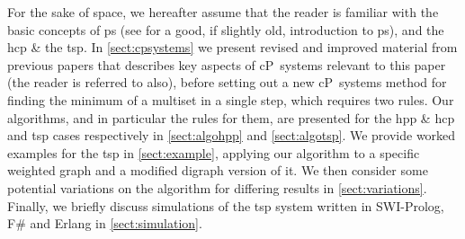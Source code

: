 For the sake of space, we hereafter assume that the reader is familiar with the basic concepts of \gls{ps} (see \cite{Paun2009} for a good, if slightly old, introduction to \gls{ps}), and the \gls{hcp} \& the \gls{tsp}.  In \autoref{sect:cpsystems} we present revised and improved material from previous papers that describes key aspects of cP~systems relevant to this paper (the reader is referred to \cite{Nicolescu2014a,RN-HW-ROMJIST14,Nicolescu2018a} also), before setting out a new cP~systems method for finding the minimum of a multiset in a single step, which requires two rules.  Our algorithms, and in particular the rules for them, are presented for the \gls{hpp} \& \gls{hcp} and \gls{tsp} cases respectively in \autoref{sect:algohpp} and \autoref{sect:algotsp}.  We provide worked examples for the \gls{tsp} in \autoref{sect:example}, applying our algorithm to a specific weighted graph and a modified digraph version of it.  We then consider some potential variations on the algorithm for differing results in \autoref{sect:variations}.  Finally, we briefly discuss simulations of the \gls{tsp} system written in SWI-Prolog, F\# and Erlang in \autoref{sect:simulation}.